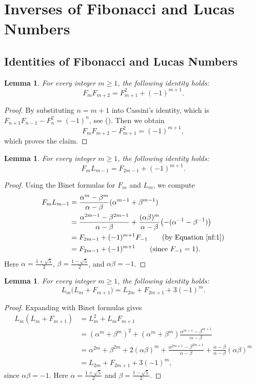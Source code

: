 \documentclass[11pt,reqno]{amsart}
\numberwithin{equation}{section}
\numberwithin{table}{section}
\numberwithin{figure}{section}
\theoremstyle{plain}
\newtheorem{lemma}[thm]{Lemma}
\theoremstyle{definition}
\theoremstyle{remark}
\begin{document}
\section{Inverses of Fibonacci and Lucas Numbers}\label{sec:3}		\subsection{Identities of Fibonacci and Lucas Numbers}				\begin{lemma}\label{id:1}	For every integer $m \geq 1$, the following identity holds:			\[			F_m F_{m+2} = F_{m+1}^2 + (-1)^{m+1}.			\]		\end{lemma}				\begin{proof}			By substituting $n = m+1$ into Cassini’s identity, which is $F_{n+1}F_{n-1} - F_n^2 = (-1)^n$, see (\cite[p.86; Theorem 5.3]{koshy2017fibonacci}). Then we obtain			\[			F_m F_{m+2} - F_{m+1}^2 = (-1)^{m+1},			\]			which proves the claim.		\end{proof}				\begin{lemma}\label{id:2}			For every integer $m \geq 1$, the following identity holds:			\[			F_m L_{m-1} = F_{2m-1} + (-1)^{m+1}.			\]		\end{lemma}				\begin{proof}			Using the Binet formulas for $F_m$ and $L_m$, we compute			\begin{align*}				F_m L_{m-1} &= \frac{\alpha^m - \beta^m}{\alpha-\beta}(\alpha^{m-1} + \beta^{m-1}) \\				&= \frac{\alpha^{2m-1} - \beta^{2m-1}}{\alpha-\beta} 				+ \frac{(\alpha\beta)^m}{\alpha-\beta}\bigl(-(\alpha^{-1} - \beta^{-1})\bigr) \\				&= F_{2m-1} + (-1)^{m+1}F_{-1} \qquad \text{(by Equation~\ref{nf:1})} \\				&= F_{2m-1} + (-1)^{m+1} \qquad \text{(since $F_{-1} = 1$)}.			\end{align*}			Here $\alpha = \tfrac{1+\sqrt{5}}{2}$, $\beta = \tfrac{1-\sqrt{5}}{2}$, and $\alpha\beta = -1$.		\end{proof}				

\begin{lemma}\label{id:3}			For every integer $m \geq 1$, the following identity holds:			\[			L_m \bigl(L_m + F_{m+1}\bigr) = L_{2m} + F_{2m+1} + 3(-1)^m.			\]		\end{lemma}				\begin{proof}			Expanding with Binet formulas gives			\begin{align*}				L_m (L_m + F_{m+1}) 				&= L_m^2 + L_m F_{m+1} \\				&= (\alpha^m + \beta^m)^2 				+ (\alpha^m + \beta^m)\frac{\alpha^{m+1} - \beta^{m+1}}{\alpha - \beta} \\				&= \alpha^{2m} + \beta^{2m} + 2(\alpha\beta)^m 				+ \frac{\alpha^{2m+1} - \beta^{2m+1}}{\alpha-\beta} 				+ \frac{\alpha-\beta}{\alpha-\beta}(\alpha\beta)^m \\				&= L_{2m} + F_{2m+1} + 3(-1)^m,			\end{align*}			since $\alpha\beta = -1$. 			Here $\alpha = \tfrac{1+\sqrt{5}}{2}$ and $\beta = \tfrac{1-\sqrt{5}}{2}$.		\end{proof}			
\end{document}
